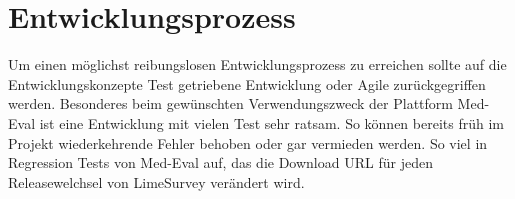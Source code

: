 \section{Entwicklungsprozess}
Um einen möglichst reibungslosen Entwicklungsprozess zu erreichen sollte auf die Entwicklungskonzepte Test getriebene Entwicklung oder Agile zurückgegriffen werden.
Besonderes beim gewünschten Verwendungszweck der Plattform Med-Eval ist eine Entwicklung mit vielen Test sehr ratsam. So können bereits früh im Projekt wiederkehrende Fehler behoben oder gar vermieden werden. So viel in Regression Tests von Med-Eval auf, das die Download URL für jeden Releasewelchsel von LimeSurvey verändert wird. 
